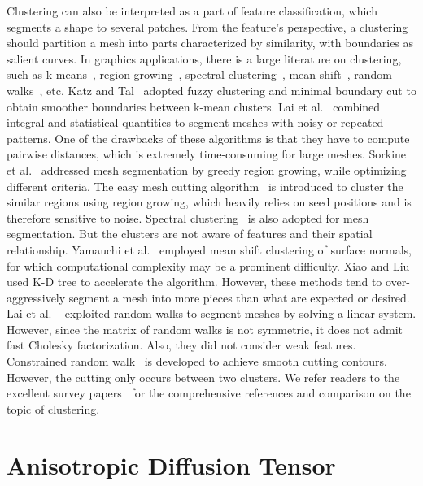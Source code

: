 \documentclass[10pt,journal,cspaper,compsoc]{IEEEtran}
\begin{document}
Clustering can also be interpreted as a part of feature
classification, which segments a shape to several patches. From the
feature's perspective, a clustering should partition a mesh into parts
characterized by similarity, with boundaries as salient curves. In
graphics applications, there is a large literature on clustering, such
as k-means~\cite{SA03,LZHM06,PDEK09}, region
growing~\cite{ODRD02,JLCW06,zheng2010}, spectral clustering~\cite{LZ04}, mean
shift~\cite{SYLL*05,CGF10}, random walks~\cite{LHMR09,ZZC11},
etc. Katz and Tal~\cite{SA03} adopted fuzzy clustering and minimal
boundary cut to obtain smoother boundaries between k-mean
clusters. Lai et al.~\cite{LZHM06} combined integral and statistical
quantities to segment meshes with noisy or repeated patterns. One of
the drawbacks of these algorithms is that they have to compute
pairwise distances, which is extremely time-consuming for large
meshes. Sorkine et al.~\cite{ODRD02} addressed mesh segmentation by
greedy region growing, while optimizing different criteria. The easy
mesh cutting algorithm~\cite{JLCW06} is introduced to cluster the
similar regions using region growing, which heavily relies on seed
positions and is therefore sensitive to noise. Spectral
clustering~\cite{LZ04} is also adopted for mesh segmentation. But the
clusters are not aware of features and their spatial
relationship. Yamauchi et al.~\cite{SYLL*05} employed mean shift
clustering of surface normals, for which computational complexity may
be a prominent difficulty. Xiao and Liu~\cite{CGF10} used K-D tree to
accelerate the algorithm. However, these methods tend to
over-aggressively segment a mesh into more pieces than what are
expected or desired. Lai et al. ~\cite{LHMR09} exploited random walks
to segment meshes by solving a linear system. However, since the
matrix of random walks is not symmetric, it does not admit fast
Cholesky factorization. Also, they did not consider weak
features. Constrained random walk~\cite{ZZC11} is developed to
achieve smooth cutting contours. However, the cutting only occurs
between two clusters. We refer readers to the excellent survey
papers~\cite{CGF08,HJGM10} for the comprehensive references and
comparison on the topic of clustering.

\section{Anisotropic Diffusion Tensor}
\label{sec:DT}
\end{document}
